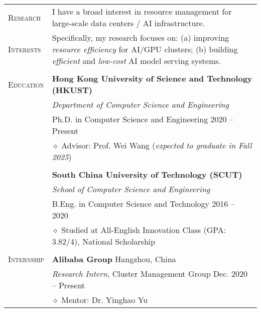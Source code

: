 \documentclass[letterpaper, 10pt]{article}
\begin{document}
\begin{longtable}{p{0.7in}p{6.0in}}


\textsc{Research}
& I have a broad interest in resource management for large-scale data centers / AI infrastructure. \\
\textsc{Interests}
& Specifically, my research focuses on: (a) improving \textit{resource efficiency} for AI/GPU clusters; (b) building \textit{efficient} and \textit{low-cost} AI model serving systems. \\
& \\

{\textsc{Education}}
& \textbf{Hong Kong University of Science and Technology (HKUST)} \\
& \textit{Department of Computer Science and Engineering} \\
& Ph.D. in Computer Science and Engineering \hfill 2020 -- Present \\
& $\diamond$ Advisor: Prof. Wei Wang \hfill (\textit{expected to graduate in Fall 2025}) \\
& \\

& \textbf{South China University of Technology (SCUT)} \\
& \textit{School of Computer Science and Engineering} \\
& B.Eng. in Computer Science and Technology \hfill 2016 -- 2020 \\
& $\diamond$ Studied at All-English Innovation Class (GPA: 3.82/4), National Scholarship \\
& \\


\nohyphens{\textsc{Internship}}
& {\textbf{Alibaba Group}} \hfill Hangzhou, China \\
& \textit{Research Intern}, Cluster Management Group \hfill Dec. 2020 -- Present \\
& $\diamond$ Mentor: Dr. Yinghao Yu \\


\end{longtable}
\end{document}
